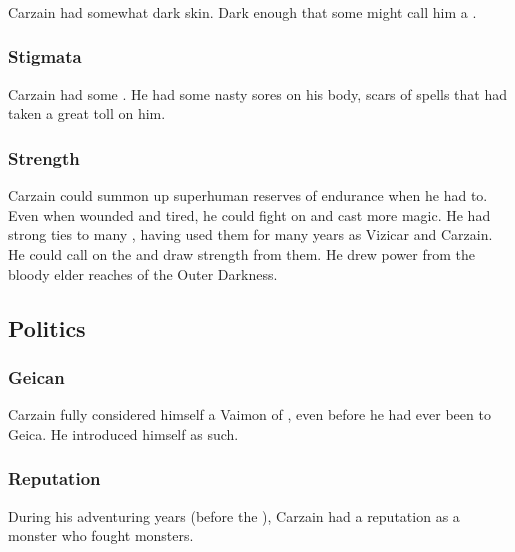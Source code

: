 \subsubsection{\Demihuman}
Carzain had somewhat dark skin. 
Dark enough that some might call him a \demihuman.





\subsubsection{Stigmata}
Carzain had some . 
He had some nasty sores on his body, scars of spells that had taken a great toll on him. 





\subsubsection{Strength}
Carzain could summon up superhuman reserves of endurance when he had to. 
Even when wounded and tired, he could fight on and cast more magic. 
He had strong ties to many \qliphoth, having used them for many years as Vizicar and Carzain. 
He could call on the \qliphoth and draw strength from them. 
He drew power from the bloody elder reaches of the Outer Darkness. 









\subsection{Politics}





\subsubsection{Geican}
Carzain fully considered himself a Vaimon of \ClanGeican, even before he had ever been to Geica.
He introduced himself as such. 





\subsubsection{Reputation}
During his adventuring years (before the ), Carzain had a reputation as a monster who fought monsters. 

